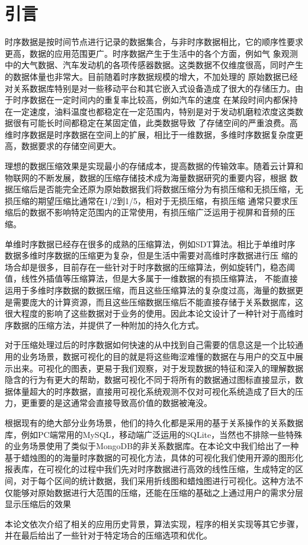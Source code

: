 
\chapter{引言}
\label{Chapter 1}

时序数据是按时间节点进行记录的数据集合，与非时序数据相比，它的顺序性要求更高，数据的应用范围更广。时序数据产生于生活中的各个方面，例如气
象观测中的大气数据、汽车发动机的各项传感器数据。这类数据不仅维度很高，同时产生的数据体量也非常大。目前随着时序数据规模的增大，不加处理的
原始数据已经对关系数据库特别是对一些移动平台和其它嵌入式设备造成了很大的存储压力。由于时序数据在一定时间内的重复率比较高，例如汽车的速度
在某段时间内都保持在一定速度，油料温度也都稳定在一定范围内，特别是对于发动机磨粒浓度这类数据很有可能长时间都稳定在某固定值，此类数据导致
了存储空间的严重浪费。高维时序数据是时序数据在空间上的扩展，相比于一维数据，多维时序数据复杂度更高，数据要求的存储空间更大。

理想的数据压缩效果是实现最小的存储成本，提高数据的传输效率。随着云计算和物联网的不断发展，数据的压缩存储技术成为海量数据研究的重要内容，根据
数据压缩后是否能完全还原为原始数据我们将数据压缩分为有损压缩和无损压缩，无损压缩的期望压缩比通常在1/2到1/5，相对于无损压缩，有损压缩
通常只要求压缩后的数据不影响特定范围内的正常使用，有损压缩广泛运用于视屏和音频的压缩。

单维时序数据已经存在很多的成熟的压缩算法，例如SDT算法。相比于单维时序数据多维时序数据的压缩更为复杂，但是生活中需要对高维时序数据进行压
缩的场合却是很多，目前存在一些针对于时序数据的压缩算法，例如旋转门，稳态阈值，线性外插值等压缩算法，但是大多属于一维数据的有损压缩算法，
不能直接运用于多维时序数据的数据压缩，而且这些压缩算法的复杂度过高，海量的数据更是需要庞大的计算资源，而且这些压缩数据压缩后不能直接存储于关系数据库，这很大程度的影响了这些数据对于业务的使用。因此本论文设计了一种针对于高维时序数据的压缩方法，并提供了一种附加的持久化方式。

对于压缩处理过后的时序数据如何快速的从中找到自己需要的信息这是一个比较通用的业务场景，数据可视化的目的就是将这些晦涩难懂的数据在与用户的交互中展示出来。可视化的图表，更易于我们观察，对于发现数据的特征和深入的理解数据隐含的行为有更大的帮助，数据可视化不同于将所有的数据通过图标直接显示，数据体量超大的时序数据，直接用可视化系统观测不仅对可视化系统造成了巨大的压力，更重要的是这通常会直接导致高价值的数据被淹没。

根据现有的绝大部分业务场景，他们的持久化都是采用的基于关系操作的关系数据库，例如PC端常用的MySQL，移动端广泛运用的SQLite，当然也不排除一些特殊的业务场景使用了类似于MongoDB的非关系数据库。在本论文中我们给出了一种基于蜡烛图的的海量时序数据的可视化方法，具体的可视化我们使用开源的图形化报表库，在可视化的过程中我们先对时序数据进行高效的线性压缩，生成特定的区间，对于每个区间的统计数据，我们采用折线图和蜡烛图进行可视化。这种方法不仅能够对原始数据进行大范围的压缩，还能在压缩的基础之上通过用户的需求分层显示压缩后的效果

本论文依次介绍了相关的应用历史背景，算法实现，程序的相关实现等其它步骤，并在最后给出了一些针对于特定场合的压缩选项和优化。







